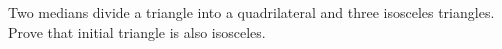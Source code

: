 \problem{}
Two medians divide a triangle into a quadrilateral and three isosceles triangles.
Prove that initial triangle is also isosceles.

\solution

\endproblem
